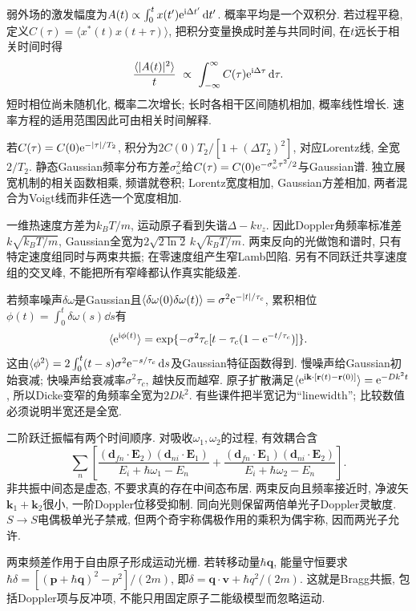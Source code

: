 弱外场的激发幅度为$A(t)\propto\int_0^t x(t')\mathrm e^{\mathrm i\Delta t'}\,\mathrm d t'$. 概率平均是一个双积分. 若过程平稳, 定义$C(\tau)=\langle x^*(t)x(t+\tau)\rangle$, 把积分变量换成时差与共同时间, 在$t$远长于相关时间时得
\[\frac{\langle|A(t)|^2\rangle}{t}\ \propto\ \int_{-\infty}^{\infty}C(\tau)\e^{\ii\Delta\tau}\dd\tau.\]
短时相位尚未随机化, 概率二次增长; 长时各相干区间随机相加, 概率线性增长. 速率方程的适用范围因此可由相关时间解释.

若$C(\tau)=C(0)\mathrm e^{-|\tau|/T_2}$, 积分为$2C(0)T_2/[1+(\Delta T_2)^2]$, 对应Lorentz线, 全宽$2/T_2$. 静态Gaussian频率分布方差$\sigma_\omega^2$给$C(\tau)=C(0)\mathrm e^{-\sigma_\omega^2\tau^2/2}$与Gaussian谱. 独立展宽机制的相关函数相乘, 频谱就卷积; Lorentz宽度相加, Gaussian方差相加, 两者混合为Voigt线而非任选一个宽度相加.

一维热速度方差为$k_BT/m$, 运动原子看到失谐$\Delta-kv_z$. 因此Doppler角频率标准差$k\sqrt{k_BT/m}$, Gaussian全宽为$2\sqrt{2\ln2}\,k\sqrt{k_BT/m}$. 两束反向的光做饱和谱时, 只有特定速度组同时与两束共振; 在零速度组产生窄Lamb凹陷. 另有不同跃迁共享速度组的交叉峰, 不能把所有窄峰都认作真实能级差.

若频率噪声$\delta\omega$是Gaussian且$\langle\delta\omega(0)\delta\omega(t)\rangle=\sigma^2\mathrm e^{-|t|/\tau_c}$, 累积相位$\phi(t)=\int_0^t\delta\omega(s)\dd s$有
\[\langle\mathrm e^{\mathrm i\phi(t)}\rangle=\exp\{-\sigma^2\tau_c[t-\tau_c(1-\mathrm e^{-t/\tau_c})]\}.\]
这由$\langle\phi^2\rangle=2\int_0^t(t-s)\sigma^2\mathrm e^{-s/\tau_c}\,\mathrm d s$及Gaussian特征函数得到. 慢噪声给Gaussian初始衰减; 快噪声给衰减率$\sigma^2\tau_c$, 越快反而越窄. 原子扩散满足$\langle\mathrm e^{\mathrm i\mathbf k\cdot[\mathbf r(t)-\mathbf r(0)]}\rangle=\mathrm e^{-Dk^2t}$, 所以Dicke变窄的角频率全宽为$2Dk^2$. 有些课件把半宽记为“linewidth”; 比较数值必须说明半宽还是全宽.

二阶跃迁振幅有两个时间顺序. 对吸收$\omega_1,\omega_2$的过程, 有效耦合含
\[\sum_n\left[\frac{(\mathbf d_{fn}\cdot\mathbf E_2)(\mathbf d_{ni}\cdot\mathbf E_1)}{E_i+\hbar\omega_1-E_n}+\frac{(\mathbf d_{fn}\cdot\mathbf E_1)(\mathbf d_{ni}\cdot\mathbf E_2)}{E_i+\hbar\omega_2-E_n}\right].\]
非共振中间态是虚态, 不要求真的存在中间态布居. 两束反向且频率接近时, 净波矢$\mathbf k_1+\mathbf k_2$很小, 一阶Doppler位移受抑制. 同向光则保留两倍单光子Doppler灵敏度. $S\to S$电偶极单光子禁戒, 但两个奇宇称偶极作用的乘积为偶宇称, 因而两光子允许.

两束频差作用于自由原子形成运动光栅. 若转移动量$\hbar\mathbf q$, 能量守恒要求$\hbar\delta=[(\mathbf p+\hbar\mathbf q)^2-p^2]/(2m)$, 即$\delta=\mathbf q\cdot\mathbf v+\hbar q^2/(2m)$. 这就是Bragg共振, 包括Doppler项与反冲项, 不能只用固定原子二能级模型而忽略运动.

